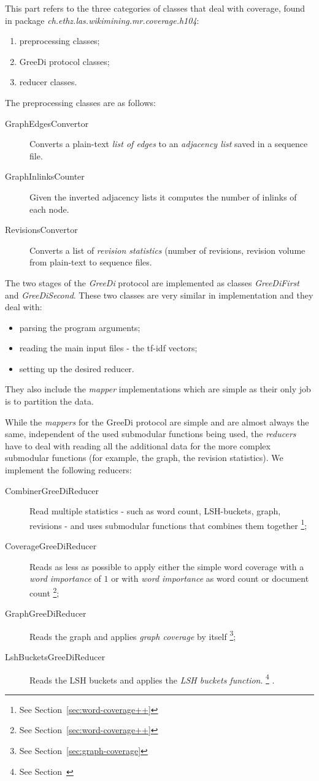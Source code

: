 This part refers to the three categories of classes that deal with coverage,
found in package \emph{ch.ethz.las.wikimining.mr.coverage.h104}:
\begin{enumerate}
  \item preprocessing classes;
  \item GreeDi protocol classes;
  \item reducer classes.
\end{enumerate}

The preprocessing classes are as follows:
\begin{description}
  \item[GraphEdgesConvertor] Converts a plain-text \emph{list of edges} to an
  \emph{adjacency list} saved in a sequence file.
  \item[GraphInlinksCounter] Given the inverted adjacency lists it computes the
  number of inlinks of each node.
  \item[RevisionsConvertor] Converts a list of \emph{revision statistics}
  (number of revisions, revision volume from plain-text to sequence files.
\end{description}

The two stages of the \emph{GreeDi} protocol are implemented as classes
\emph{GreeDiFirst} and \emph{GreeDiSecond}. These two classes are very similar
in implementation and they deal with:
\begin{itemize}
  \item parsing the program arguments;
  \item reading the main input files - the tf-idf vectors;
  \item setting up the desired reducer.
\end{itemize}
They also include the \emph{mapper} implementations which are simple as their
only job is to partition the data.

While the \emph{mappers} for the GreeDi protocol are simple and are almost
always the same, independent of the used submodular functions being used, the
\emph{reducers} have to deal with reading all the additional data for the more
complex submodular functions (for example, the graph, the revision statistics).
We implement the following reducers:
\begin{description}
  \item[CombinerGreeDiReducer] Read multiple statistics - such as word count,
  LSH-buckets, graph, revisions - and uses submodular functions that combines
  them together \footnote{See Section~\vref{sec:word-coverage++}};
  \item[CoverageGreeDiReducer] Reads as less as possible to apply either the
  simple word coverage with a \emph{word importance} of \(1\) or with
  \emph{word importance} as word count or document count \footnote{See
  Section~\vref{sec:word-coverage++}};
  \item[GraphGreeDiReducer] Reads the graph and applies \emph{graph coverage}
  by itself \footnote{See Section~\vref{sec:graph-coverage}};
  \item[LshBucketsGreeDiReducer] Reads the \ac{LSH} buckets and applies the
  \emph{\ac{LSH} buckets function}. \footnote{See Section~ } .
\end{description}

